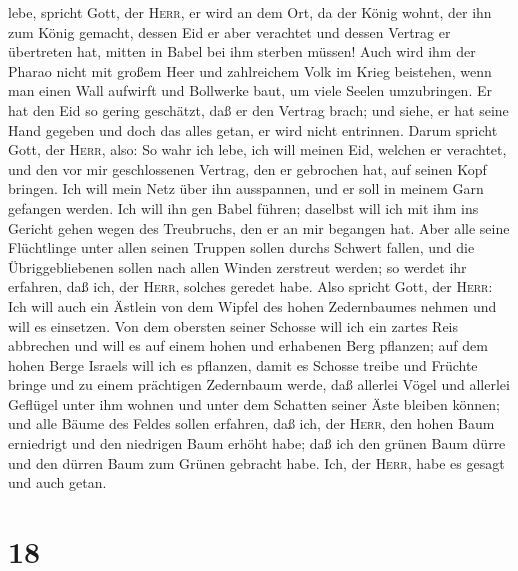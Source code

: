 lebe, spricht Gott, der \textsc{Herr}, er wird an dem Ort, da der König
wohnt, der ihn zum König gemacht, dessen Eid er aber verachtet und
dessen Vertrag er übertreten hat, mitten in Babel bei ihm sterben
müssen!  Auch wird ihm der Pharao nicht mit großem Heer
und zahlreichem Volk im Krieg beistehen, wenn man einen Wall aufwirft
und Bollwerke baut, um viele Seelen umzubringen.  Er hat
den Eid so gering geschätzt, daß er den Vertrag brach; und siehe, er hat
seine Hand gegeben und doch das alles getan, er wird nicht entrinnen.
 Darum spricht Gott, der \textsc{Herr}, also: So wahr ich
lebe, ich will meinen Eid, welchen er verachtet, und den vor mir
geschlossenen Vertrag, den er gebrochen hat, auf seinen Kopf bringen.
 Ich will mein Netz über ihn ausspannen, und er soll in
meinem Garn gefangen werden. Ich will ihn gen Babel führen; daselbst
will ich mit ihm ins Gericht gehen wegen des Treubruchs, den er an mir
begangen hat.  Aber alle seine Flüchtlinge unter allen
seinen Truppen sollen durchs Schwert fallen, und die Übriggebliebenen
sollen nach allen Winden zerstreut werden; so werdet ihr erfahren, daß
ich, der \textsc{Herr}, solches geredet habe.  Also
spricht Gott, der \textsc{Herr}: Ich will auch ein Ästlein von dem
Wipfel des hohen Zedernbaumes nehmen und will es einsetzen. Von dem
obersten seiner Schosse will ich ein zartes Reis abbrechen und will es
auf einem hohen und erhabenen Berg pflanzen;  auf dem
hohen Berge Israels will ich es pflanzen, damit es Schosse treibe und
Früchte bringe und zu einem prächtigen Zedernbaum werde, daß allerlei
Vögel und allerlei Geflügel unter ihm wohnen und unter dem Schatten
seiner Äste bleiben können;  und alle Bäume des Feldes
sollen erfahren, daß ich, der \textsc{Herr}, den hohen Baum erniedrigt
und den niedrigen Baum erhöht habe; daß ich den grünen Baum dürre und
den dürren Baum zum Grünen gebracht habe. Ich, der \textsc{Herr}, habe
es gesagt und auch getan.

\hypertarget{section-17}{%
\section{18}\label{section-17}}

